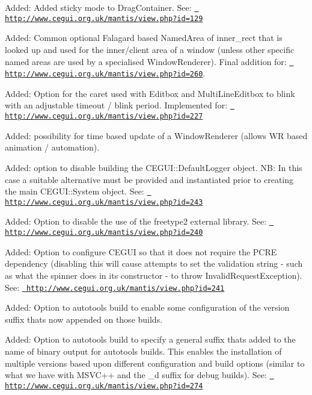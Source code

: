 \begin{DoxyItemize}
\item Added\+: Added \textquotesingle{}sticky\textquotesingle{} mode to Drag\+Container. See\+: \href{http://www.cegui.org.uk/mantis/view.php?id=129}{\texttt{ http\+://www.\+cegui.\+org.\+uk/mantis/view.\+php?id=129}}
\item Added\+: Common optional Falagard based Named\+Area of \textquotesingle{}inner\+\_\+rect\textquotesingle{} that is looked up and used for the inner/client area of a window (unless other specific named areas are used by a specialised Window\+Renderer). Final addition for\+: \href{http://www.cegui.org.uk/mantis/view.php?id=260}{\texttt{ http\+://www.\+cegui.\+org.\+uk/mantis/view.\+php?id=260}}.
\item Added\+: Option for the caret used with Editbox and Multi\+Line\+Editbox to blink with an adjustable timeout / blink period. Implemented for\+: \href{http://www.cegui.org.uk/mantis/view.php?id=227}{\texttt{ http\+://www.\+cegui.\+org.\+uk/mantis/view.\+php?id=227}}
\item Added\+: possibility for time based update of a Window\+Renderer (allows WR based animation / automation).
\item Added\+: option to disable building the C\+E\+G\+U\+I\+::\+Default\+Logger object. NB\+: In this case a suitable alternative must be provided and instantiated prior to creating the main C\+E\+G\+U\+I\+::\+System object. See\+: \href{http://www.cegui.org.uk/mantis/view.php?id=243}{\texttt{ http\+://www.\+cegui.\+org.\+uk/mantis/view.\+php?id=243}}
\item Added\+: Option to disable the use of the freetype2 external library. See\+: \href{http://www.cegui.org.uk/mantis/view.php?id=240}{\texttt{ http\+://www.\+cegui.\+org.\+uk/mantis/view.\+php?id=240}}
\item Added\+: Option to configure C\+E\+G\+UI so that it does not require the P\+C\+RE dependency (disabling this will cause attempts to set the validation string -\/ such as what the spinner does in it\textquotesingle{}s constructor -\/ to throw Invalid\+Request\+Exception). See\+: \href{http://www.cegui.org.uk/mantis/view.php?id=241}{\texttt{ http\+://www.\+cegui.\+org.\+uk/mantis/view.\+php?id=241}}
\item Added\+: Option to autotools build to enable some configuration of the version suffix that\textquotesingle{}s now appended on those builds.
\item Added\+: Option to autotools build to specify a general suffix that\textquotesingle{}s added to the name of binary output for autotools builds. This enables the installation of multiple versions based upon different configuration and build options (similar to what we have with M\+S\+V\+C++ and the \+\_\+d suffix for debug builds). See\+: \href{http://www.cegui.org.uk/mantis/view.php?id=274}{\texttt{ http\+://www.\+cegui.\+org.\+uk/mantis/view.\+php?id=274}}

\end{DoxyItemize}
